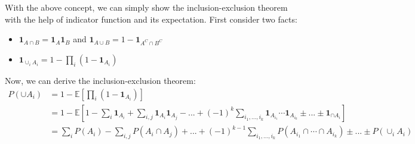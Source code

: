 \documentclass[11pt]{article}
\begin{document}
With the above concept, we can simply show the inclusion-exclusion theorem with the help of indicator function and its expectation. First consider two facts:
\begin{itemize}
	\item $\mathbf{1}_{A\cap B} = \mathbf{1}_A\mathbf{1}_B$ and $\mathbf{1}_{A\cup B} = 1-\mathbf{1}_{A^C\cap B^C}$
	\item $\mathbf{1}_{\cup_iA_i} = 1-\prod_i(1-\mathbf{1}_{A_i})$
\end{itemize}
Now, we can derive the inclusion-exclusion theorem:
\begin{align*}
P(\cup A_i) &= 1-\mathbb{E}[\prod_i(1-\mathbf{1}_{A_i})]\\
&= 1 - \mathbb{E}[1-\sum_i\mathbf{1}_{A_i} + \sum_{i,j}\mathbf{1}_{A_i}\mathbf{1}_{A_j}-...+(-1)^k\sum_{i_1,...,i_k}\mathbf{1}_{A_{i_1}}\cdots\mathbf{1}_{A_{i_k}}\pm...\pm\mathbf{1}_{\cap A_i}]\\
&=\sum_i P(A_i) - \sum_{i,j}P(A_i\cap A_j) +...+(-1)^{k-1}\sum_{i_1,...,i_k}P(A_{i_1}\cap\cdots\cap A_{i_k})\pm...\pm P(\cup_i A_i)
\end{align*}
\end{document}
